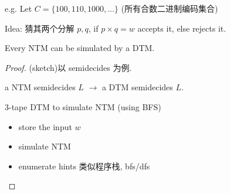 e.g. Let $C=\{ 100, 110, 1000, \dots \}$ (所有合数二进制编码集合) 

Idea: 猜其两个分解 $p,q$, if $p\times q=w$ accepts it, else rejects it. 

\begin{theorem}
    Every NTM can be simulated by a DTM. 
\end{theorem}
\begin{proof}(sketch)以 semidecides 为例. 

    a NTM semidecides $L$ $\to$ a DTM semidecides $L$. 

    3-tape DTM to simulate NTM (using BFS) 
    \begin{itemize}
        \item store the input $w$
        \item simulate NTM
        \item enumerate hints 类似程序栈, bfs/dfs
    \end{itemize}
\end{proof}
